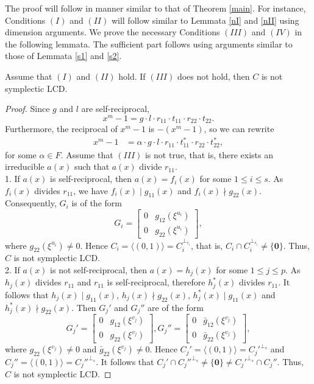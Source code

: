 \documentclass[a4paper,12pt]{article}
\begin{document}
	The proof will follow in manner similar to that of Theorem \ref{main}. For instance, Conditions $(I)$ and $(II)$ will follow similar to Lemmata \ref{nI} and \ref{nII} using dimension arguments. We prove the necessary Conditions $(III)$ and $(IV)$ in the following lemmata. The sufficient part follows using arguments similar to those of Lemmata  \ref{s1} and \ref{s2}.


\begin{lemma}\label{nIIIs}
Assume that $(I)$ and $(II)$ hold. If $(III)$ does not hold, then $C$ is not symplectic LCD.
\end{lemma}
\begin{proof}
	Since  $g$ and $l$ are self-reciprocal, 
	\[
	x^m-1  = g \cdot l \cdot r_{11} \cdot t_{11} \cdot r_{22} \cdot t_{22}.  
	\] 
	Furthermore, the  reciprocal of  $x^m-1$ is  $-(x^m-1)$, so we can rewrite 
	\begin{align*}
		x^m-1   &= \alpha \cdot g \cdot l \cdot r_{11} \cdot t_{11}^*    \cdot  r_{22} \cdot  t_{22}^*,
	\end{align*} 
	for some $\alpha 
	\in F$. Assume that $(III)$ is not true, that is, there exists an irreducible  $a(x)$ such that $a(x)$ divide $r_{11}$.\\
	1. If $a(x)$ is self-reciprocal, then $a(x)=f_i(x)$ for some $1\leq i\leq s$. As $f_i(x)$ divides $r_{11}$, we have $f_i(x)\mid g_{11}(x)$ and $f_i(x)\nmid g_{22}(x)$. Consequently, $G_i$ is of the form
	\[
	G_i= \begin{bmatrix}
		0 & g_{12}(\xi^{u_i}) \\
		0 & g_{22}(\xi^{u_i}) 
	\end{bmatrix},
	\]
where 	$g_{22}(\xi^{u_i})\neq 0$. Hence $C_i=\langle (0,1)\rangle=C_i^{\perp_{s_i}}$, that is, $C_i\cap C_i^{\perp_{s_i}}\neq\{\mathbf{0}\}$. Thus, $C$ is not symplectic LCD.\\
2. If $a(x)$ is not self-reciprocal, then $a(x)=h_j(x)$ for some $1\leq j\leq p$. As $h_j(x)$ divides $r_{11}$ and $r_{11}$ is self-reciprocal, therefore $h_j^*(x)$ divides $r_{11}$. It follows that $h_j(x)\mid g_{11}(x)$, $h_j(x)\nmid g_{22}(x)$,  $h_j^*(x)\mid g_{11}(x)$ and  $h_j^*(x)\nmid g_{22}(x)$. Then $G_j'$ and $G_j''$ are of the form
$$G_j'=   \begin{bmatrix}
	0 & g_{12}(\xi^{v_j}) \\
	0 & g_{22}(\xi^{v_j}) 
\end{bmatrix} ,
G_j''=   \begin{bmatrix}
	0 & \bar{g}_{12}(\xi^{v_j}) \\
	0 & \bar{g}_{22}(\xi^{v_j}) 
\end{bmatrix},$$
  where	$g_{22}(\xi^{v_j})\neq 0$ and $\bar{g}_{22}(\xi^{v_j})\neq 0$. Hence $C_j'=\langle (0,1)\rangle=C_j'^{\perp_{s}}$ and $C_j''=\langle (0,1)\rangle=C_j''^{\perp_{s}}$. It follows that $C_j'\cap C_j''^{\perp_{s}}\neq \{\mathbf{0}\}\neq C_j'^{\perp_{s}}\cap C_j''$. Thus, $C$ is not symplectic LCD.
\end{proof}
\end{document}
